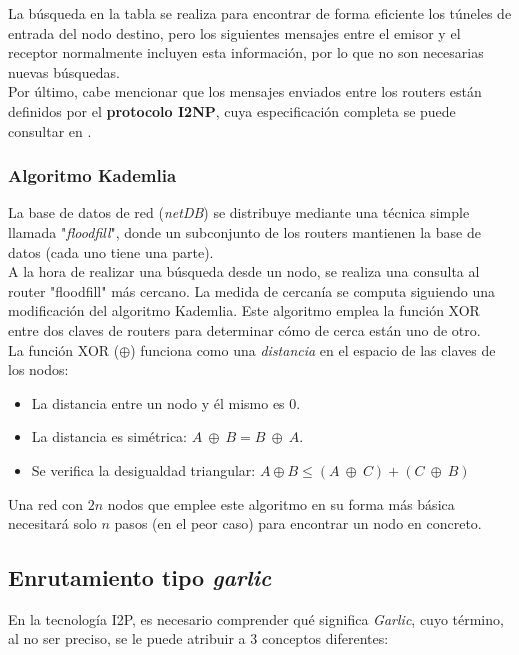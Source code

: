 La búsqueda en la tabla se realiza para encontrar de forma eficiente los túneles de entrada del nodo destino, pero los siguientes mensajes entre el emisor y el receptor normalmente incluyen esta información, por lo que no son necesarias nuevas búsquedas.\\

Por último, cabe mencionar que los mensajes enviados entre los routers están definidos por el \textbf{protocolo I2NP}, cuya especificación completa se puede consultar en \cite{I2NP}.

\subsubsection*{Algoritmo Kademlia}


La base de datos de red (\textit{netDB}) se distribuye mediante una técnica simple llamada "\textit{floodfill}", donde un subconjunto de los routers mantienen la base de datos (cada uno tiene una parte). \\

A la hora de realizar una búsqueda desde un nodo, se realiza una consulta al router "floodfill" más cercano. La medida de cercanía se computa siguiendo una modificación del algoritmo Kademlia. Este algoritmo emplea la función XOR entre dos claves de routers para determinar cómo de cerca están uno de otro.\\

La función XOR ($\oplus$) funciona como una \textit{distancia} en el espacio de las claves de los nodos:

\begin{itemize}
	\item La distancia entre un nodo y él mismo es 0.
	\item La distancia es simétrica: $A \ \oplus \ B = B \ \oplus \ A$.
	\item Se verifica la desigualdad triangular: $A \oplus B \leq (A \ \oplus \ C) + (C \ \oplus \ B)$
\end{itemize}

Una red con $2n$ nodos que emplee este algoritmo en su forma más básica necesitará solo $n$ pasos (en el peor caso) para encontrar un nodo en concreto.



\subsection{Enrutamiento tipo \textit{garlic}}

En la tecnología I2P, es necesario comprender qué significa \textit{Garlic}, cuyo término, al no ser preciso, se le puede atribuir a 3 conceptos diferentes: 

